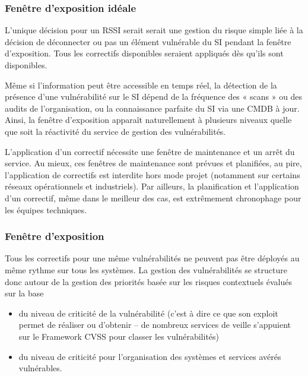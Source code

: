 \begin{frame}
\frametitle<presentation>{Fenêtre d'exposition idéale}
\end{frame}

L’unique décision pour un RSSI serait  serait une gestion du risque simple liée à la décision de déconnecter ou pas un élément vulnérable du SI pendant la fenêtre d’exposition. Tous les correctifs disponibles seraient appliqués dès qu’ils sont disponibles.

Même si l’information peut être accessible en temps réel, la détection de la présence d’une vulnérabilité sur le SI dépend de la fréquence des « scans » ou des audits de l’organisation, ou la connaissance parfaite du SI via une CMDB à jour. Ainsi, la fenêtre d’exposition apparaît naturellement à plusieurs niveaux quelle que soit la réactivité du service de gestion des vulnérabilités.

 L’application d’un correctif nécessite une fenêtre de maintenance et un arrêt du service. Au mieux, ces fenêtres de maintenance sont prévues et planifiées, au pire, l’application de correctifs est interdite hors mode projet (notamment sur certains réseaux opérationnels et industriels). Par ailleurs, la planification et l’application d’un correctif, même dans le meilleur des cas, est extrêmement chronophage pour les équipes techniques.
 
\begin{frame}
\frametitle<presentation>{Fenêtre d'exposition}
\end{frame}

Tous les correctifs  pour une même vulnérabilités ne peuvent pas être déployés au même rythme sur tous les systèmes. La gestion des vulnérabilités se structure donc autour de la gestion des priorités basée sur les risques contextuels évalués sur la base  

\begin{itemize}
  \item du niveau de criticité de la vulnérabilité (c’est à dire ce que son exploit permet de réaliser ou d’obtenir – de nombreux services de veille s’appuient sur le Framework CVSS pour classer les vulnérabilités)
  \item du niveau de criticité pour l’organisation des systèmes et services avérés vulnérables.
\end{itemize}


